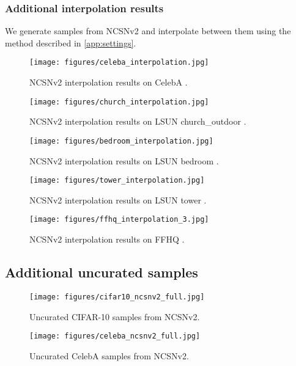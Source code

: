\documentclass{article}
\begin{document}
\subsubsection{Additional interpolation results}
We generate samples from NCSNv2 and interpolate between them using the method described in \cref{app:settings}. 
\begin{figure}[H]
    \centering
    \texttt{[image: figures/celeba\_interpolation.jpg]}
    \caption{NCSNv2 interpolation results on CelebA .}
\end{figure}
\begin{figure}[H]
    \centering
    \texttt{[image: figures/church\_interpolation.jpg]}
    \caption{NCSNv2 interpolation results on LSUN church\_outdoor .}
\end{figure}
\begin{figure}[H]
    \centering
    \texttt{[image: figures/bedroom\_interpolation.jpg]}
    \caption{NCSNv2 interpolation results on LSUN bedroom .}
\end{figure}
\newpage
\vspace*{\fill}
\begin{figure}[H]
    \centering
    \texttt{[image: figures/tower\_interpolation.jpg]}
    \caption{NCSNv2 interpolation results on LSUN tower .}
\end{figure}
\begin{figure}[H]
    \centering
    \texttt{[image: figures/ffhq\_interpolation\_3.jpg]}
    \caption{NCSNv2 interpolation results on FFHQ .}
\end{figure}
\vspace*{\fill}

\newpage
\subsection{Additional uncurated samples}\label{app:samples}
\vspace*{\fill}
\begin{figure}[H]
    \centering
    \texttt{[image: figures/cifar10\_ncsnv2\_full.jpg]}
    \caption{Uncurated CIFAR-10  samples from NCSNv2.}
    \label{fig:cifar10_full}
\end{figure}
\vspace*{\fill}

\newpage
\vspace*{\fill}
\begin{figure}[H]
    \centering
    \texttt{[image: figures/celeba\_ncsnv2\_full.jpg]}
    \caption{Uncurated CelebA  samples from NCSNv2.}
    \label{fig:celeba_full}
\end{figure}
\vspace*{\fill}
\end{document}
